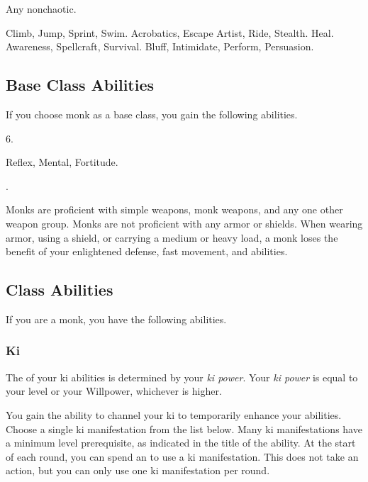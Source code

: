      Any nonchaotic.

     Climb, Jump, Sprint, Swim.
     Acrobatics, Escape Artist, Ride, Stealth.
     Heal.
     Awareness, Spellcraft, Survival.
     Bluff, Intimidate, Perform, Persuasion.

    \subsection{Base Class Abilities}
        If you choose monk as a base class, you gain the following abilities.

         6.

          Reflex,  Mental,  Fortitude.

         .

        Monks are proficient with simple weapons, monk weapons, and any one other weapon group.
        Monks are not proficient with any armor or shields.
        When wearing armor, using a shield, or carrying a medium or heavy load, a monk loses the benefit of your enlightened defense, fast movement, and \ki abilities.

    \subsection{Class Abilities}
        If you are a monk, you have the following abilities.

        \subsubsection{Ki}
            The  of your ki abilities is determined by your \textit{ki power}.
            Your \textit{ki power} is equal to your level or your Willpower, whichever is higher.

            You gain the ability to channel your ki to temporarily enhance your abilities.
            Choose a single ki manifestation from the list below.
            Many ki manifestations have a minimum level prerequisite, as indicated in the title of the ability.
            At the start of each round, you can spend an  to use a ki manifestation.
            This does not take an action, but you can only use one ki manifestation per round.

